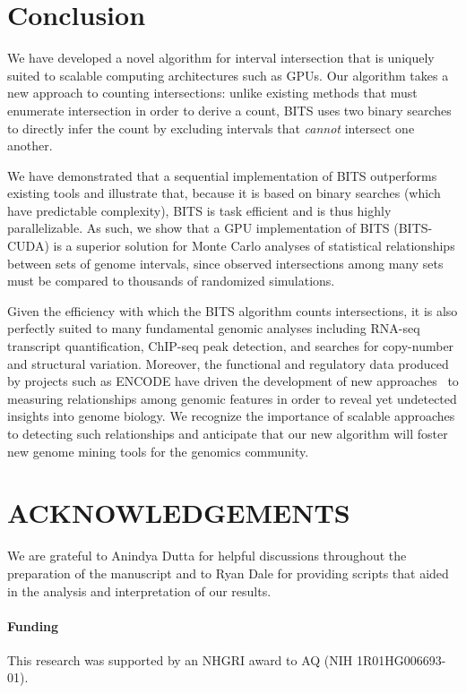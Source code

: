 \documentclass{bioinfo}
\begin{document}
\section{Conclusion}
We have developed a novel algorithm for interval intersection that
is uniquely suited to scalable computing architectures such as GPUs.
Our algorithm takes a new approach to counting intersections: 
unlike existing methods that must enumerate intersection in order to 
derive a count, BITS uses two binary searches to directly infer the 
count by excluding intervals that \emph{cannot} intersect one another. 

We have demonstrated that a sequential implementation of BITS outperforms 
existing tools and illustrate that, because it is based on binary searches
(which have predictable complexity), BITS is task efficient and is thus highly 
parallelizable. As such, we show that a GPU implementation of BITS (BITS-CUDA)
is a superior solution for Monte Carlo analyses of statistical relationships 
between sets of genome intervals, since observed intersections among many sets 
must be compared to thousands of randomized simulations.

Given the efficiency with which the BITS algorithm counts intersections,
it is also perfectly suited to many fundamental genomic analyses
including RNA-seq transcript quantification, ChIP-seq peak detection, and 
searches for copy-number and structural variation. Moreover, the 
functional and regulatory data produced by projects such as ENCODE
have driven the development of new approaches~\citep{favorov2012} 
to measuring relationships among genomic features in order to reveal yet 
undetected insights into genome biology. We recognize the importance of 
scalable approaches to detecting such relationships and anticipate that 
our new algorithm will foster new genome mining tools for the 
genomics community.
\vspace{-2em}
\section*{ACKNOWLEDGEMENTS}
We are grateful to Anindya Dutta for helpful discussions throughout the
preparation of the manuscript and to Ryan Dale for providing scripts that
aided in the analysis and interpretation of our results.

\paragraph{Funding\textcolon} This research was supported by an NHGRI award to AQ (NIH 1R01HG006693-01).
\vspace{-2em}
        
        
\end{document}
